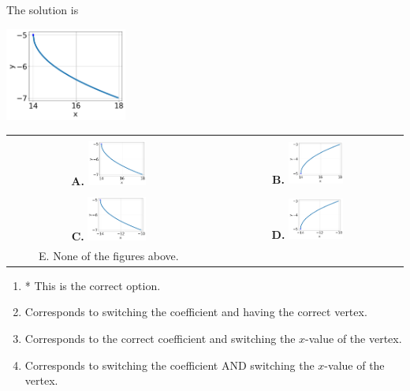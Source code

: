 \documentclass{extbook}[14pt]
\begin{document}
 
 The solution is  
 \begin{center} \includegraphics[width=0.3\textwidth]{../Figures/radicalEquationToGraphBB.png} \end{center}\begin{tabular}{|c|c|} 
\hline 
 & \tabularnewline 
 \textbf{A.} \includegraphics[width=0.3\textwidth]{../Figures/radicalEquationToGraphBB.png} & \textbf{B.} \includegraphics[width=0.3\textwidth]{../Figures/radicalEquationToGraphDB.png} \tabularnewline 
\hline 
 & \tabularnewline 
 \textbf{C.} \includegraphics[width=0.3\textwidth]{../Figures/radicalEquationToGraphCB.png} & \textbf{D.} \includegraphics[width=0.3\textwidth]{../Figures/radicalEquationToGraphAB.png} \tabularnewline 
\hline 
 E. None of the figures above. & \tabularnewline 
\hline 
 \end{tabular} 
 
\begin{enumerate}[label=\Alph*.] 
\item * This is the correct option.  
\item Corresponds to switching the coefficient and having the correct vertex.  
\item Corresponds to the correct coefficient and switching the $x$-value of the vertex.  
\item Corresponds to switching the coefficient AND switching the $x$-value of the vertex.  
\end{enumerate} 
 
\end{document}
